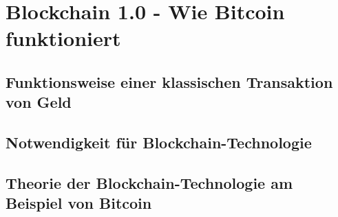 \chapter{Blockchain 1.0 - Wie Bitcoin funktioniert}
\section{Funktionsweise einer klassischen Transaktion von Geld}
\section{Notwendigkeit für Blockchain-Technologie}
\section{Theorie der Blockchain-Technologie am Beispiel von Bitcoin}
